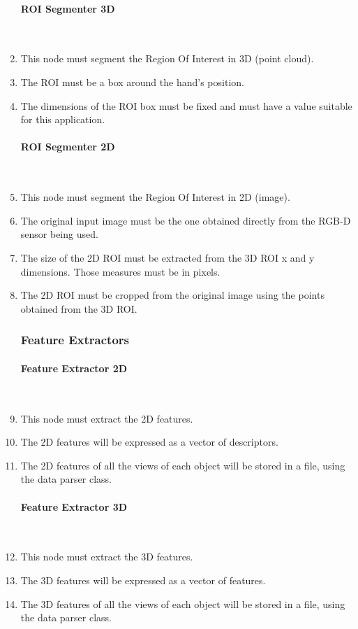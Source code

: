 \begin{enumerate}[label=\textbf{FR\threedigits*}, leftmargin=2cm]
   \paragraph{ROI Segmenter 3D}\mbox{}\\
	\item This node must segment the Region Of Interest in 3D (point cloud). 
	\item The ROI must be a box around the hand's position. 
	\item The dimensions of the ROI box must be fixed and must have a value suitable for this application.  

   \paragraph{ROI Segmenter 2D}\mbox{}\\
   	\item This node must segment the Region Of Interest in 2D (image).
   	\item The original input image must be the one obtained directly from the RGB-D sensor being used.
   	\item The size of the 2D ROI must be extracted from the 3D ROI x and y dimensions. Those measures must be in pixels. 
	\item The 2D ROI must be cropped from the original image using the points obtained from the 3D ROI. 

\subsubsection{Feature Extractors}

   \paragraph{Feature Extractor 2D}\mbox{}\\
	\item This node must extract the 2D features. 
	\item The 2D features will be expressed as a vector of descriptors. %
	\item The 2D features of all the views of each object will be stored in a file, using the data parser class.  
  
  \paragraph{Feature Extractor 3D}\mbox{}\\
   	\item This node must extract the 3D features. 
	\item The 3D features will be expressed as a vector of features. %
	\item The 3D features of all the views of each object will be stored in a file, using the data parser class.  


\end{enumerate}
